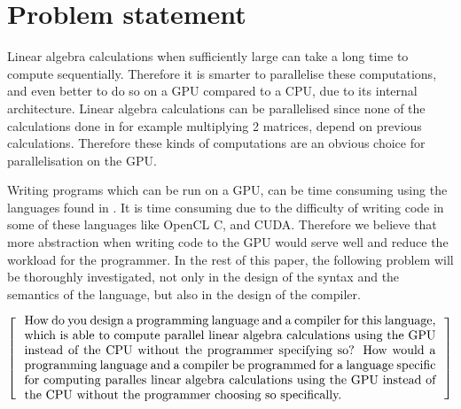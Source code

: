 \newpage
\section{Problem statement}

Linear algebra calculations when sufficiently large can take a long time to compute sequentially. 
Therefore it is smarter to parallelise these computations, and even better to do so on a GPU compared to a CPU, due to its internal architecture.
Linear algebra calculations can be parallelised since none of the calculations done in for example multiplying 2 matrices, depend on previous calculations.
Therefore these kinds of computations are an obvious choice for parallelisation on the GPU.

Writing programs which can be run on a GPU, can be time consuming using the languages found in .
It is time consuming due to the difficulty of writing code in some of these languages like OpenCL C, and CUDA.
Therefore we believe that more abstraction when writing code to the GPU would serve well and reduce the workload for the programmer.
In the rest of this paper, the following problem will be thoroughly investigated, not only in the design of the syntax and the semantics of the language, but also in the design of the compiler.

\[
  \left[
  \begin{minipage}{\textwidth}
  \centering
  \begin{minipage}{0.96\textwidth}
  How do you design a programming language and a compiler for this language, which is able to compute parallel linear algebra calculations using the GPU instead of the CPU without the programmer specifying so?
  How would a programming language and a compiler be programmed for a language specific for computing paralles linear algebra calculations using the GPU instead of the CPU without the programmer choosing so specifically.  


  \end{minipage}
  \end{minipage}
    \right]
\]